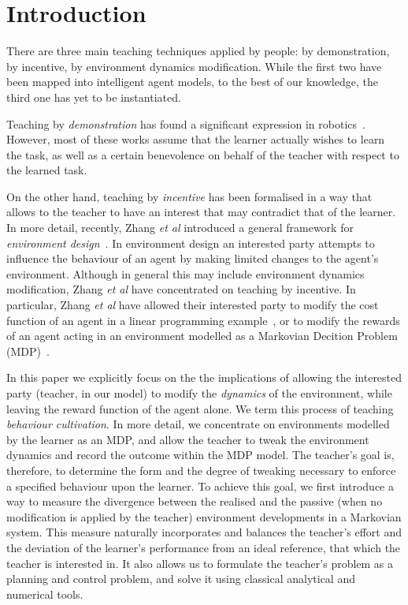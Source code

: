 

\section{Introduction}

There are three main teaching techniques applied by people: by
demonstration, by incentive, by environment dynamics
modification. While the
first two have been mapped into intelligent agent models, to the best
of our knowledge, the third one has yet to be instantiated.

Teaching by {\em demonstration} has found a significant expression in
robotics~\cite{argal_etal_2009}. However, most of these works assume
that the learner actually wishes to learn the task, as well as a
certain benevolence on behalf of the teacher with respect to the
learned task.

On the other hand, teaching by {\em incentive} has been formalised in a way
that allows to the teacher to have an interest that may contradict
that of the learner. In more detail, recently, Zhang \emph{et al}
introduced a general framework for \emph{environment
  design}~\cite{Zhang09:General}. In environment design an interested
party attempts to influence the behaviour of an agent by making limited
changes to the agent's environment. Although in general this may
include environment dynamics modification, Zhang \emph{et al} have
concentrated on teaching by incentive. In particular, Zhang \emph{et
  al} have allowed their interested party to modify the cost function
of an agent in a linear programming example~\cite{Zhang09:General}, or
to modify the rewards of an agent acting in an environment modelled as
a Markovian Decition Problem (MDP)~\cite{zhang_parkes_2008,Zhang09:Policy}.

In this paper we explicitly focus on the the implications of allowing
the interested party (teacher, in our model) to modify the
\emph{dynamics} of the environment, while leaving the reward function
of the agent alone. We term this process of teaching {\em behaviour
  cultivation}. In more detail, we concentrate on environments
modelled by the learner as an MDP, and allow the teacher to tweak the
environment dynamics and record the outcome within the MDP model. The
teacher's goal is, therefore, to determine the form and the degree of
tweaking necessary to enforce a specified behaviour upon the
learner. To achieve this goal, we first introduce a way to measure the
divergence between the realised and the passive (when no modification
is applied by the teacher) environment developments in a Markovian
system. This measure naturally incorporates and balances the teacher's
effort and the deviation of the learner's performance from an ideal
reference, that which the teacher is interested in. It also allows us
to formulate the teacher's problem as a planning and control problem,
and solve it using classical analytical and numerical tools.

